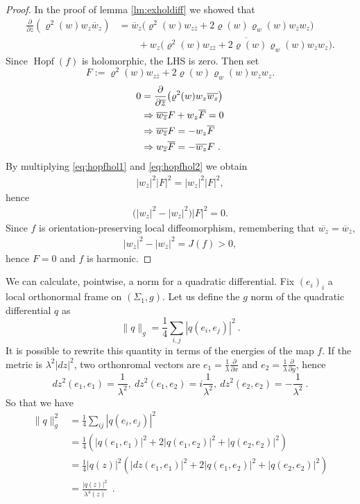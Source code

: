 \documentclass[a4paper,11pt,openright,twoside]{book}
\renewcommand{\rho}{\varrho}
\newcommand{\Hopf}{\operatorname{Hopf}}
\newcommand{\1}{\mathds{1}}
\theoremstyle{plain}
\theoremstyle{definition}
\theoremstyle{remark}
\begin{document}
\begin{proof}
	In the proof of lemma \ref{lm:exholdiff} we showed that
	\begin{align*}
		\frac{\partial}{\partial \overline{z}} (\rho^2(w)w_z\overline{w}_z)
		&=
		\overline{w}_z\bigl(\rho^2(w)w_{z\overline{z}}+2\rho(w)\rho_w(w)w_{\overline{z}}w_z\bigr)\\
		&\qquad+
		w_z\overline{\bigl(\rho^2(w)w_{z\overline{z}}+2\rho(w)\rho_w(w)w_{\overline{z}}w_z\bigr)}.
	\end{align*}
	Since $\Hopf(f)$ is holomorphic, the LHS is zero. Then set
	\[
	F:=\rho^2(w)w_{z\overline{z}}+2\rho(w)\rho_w(w)w_{\overline{z}}w_z.
	\]
\begin{align}
	0
	&=
	\frac{\partial}{\partial \overline z}\bigl(\rho^2(w)w_z\overline{w_z}\bigr)\notag\\
	&\Rightarrow
	\overline{w_{\overline z}}F+w_z\overline F=0\notag\\
	&\Rightarrow
	\overline{w_{\overline z}}F=-w_z\overline F\label{eq:hopfhol1}\\
	&\Rightarrow
	w_{\overline z}\overline{F}=-\overline{w_z}F\label{eq:hopfhol2}\ .
\end{align}
By multiplying \eqref{eq:hopfhol1} and \eqref{eq:hopfhol2} we obtain
\begin{align*}
	|w_{\overline z}|^2|F|^2=|w_z|^2|F|^2,
\end{align*}
hence
\begin{align*}
	\bigl(|w_z|^2-|w_{\overline z}|^2\bigr)|F|^2=0.
\end{align*}
	Since $f$ is orientation-preserving local diffeomorphism, remembering that $\overline{w_z} = \overline{w}_{\overline{z}}$,
	\begin{align*}
		|w_z|^2-|w_{\overline{z}}|^2=J(f)>0,
	\end{align*}
	hence $F=0$ and $f$ is harmonic. 
\end{proof}
We can calculate, pointwise, a norm for a quadratic differential. Fix $(e_i)_i$ a local orthonormal frame on $(\Sigma_1,g)$. Let us define the $g$ norm of the quadratic differential $q $ as
\[ \|q\|_g = \frac{1}{4}\sum_{i,j} |q(e_i,e_j)|^2\ . \] 
It is possible to rewrite this quantity in terms of the energies of the map $f$. If the metric is $\lambda^2|dz|^2$, two orthonromal vectors are $e_1= \frac{1}{\lambda} \frac{\partial  }{\partial x} $ and $e_2 = \frac{1}{\lambda}\frac{\partial  }{\partial y} $, hence
\[dz^2(e_1,e_1)= \frac{1}{\lambda^2},\ dz^2(e_1,e_2)=i \frac{1}{\lambda^2},\ dz^2(e_2,e_2)=-\frac{1}{\lambda^2}\ .\] 
So that we have
\begin{align*}
	\|q\|_{g}^2 &= \frac{1}{4}\sum_{ij} |q(e_i,e_j)|^2 \\
	&= \frac{1}{4}\left( |q(e_1,e_1)|^2+2|q(e_1,e_2)|^2+|q(e_2,e_2)|^2 \right)  \\
	&= \frac{1}{4}|q(z)|^2\left(|dz(e_1,e_1)|^2 +2|q(e_1,e_2)|^2+|q(e_2,e_2)|^2\right)\\
	&=  \frac{|q(z)|^2}{\lambda^4(z)}
\ \ . 
\end{align*}
\end{document}

